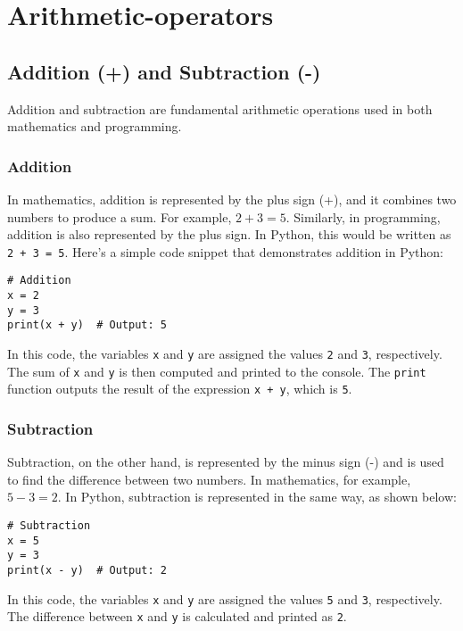 \section{Arithmetic-operators}

\subsection{Addition (+) and Subtraction (-)}
Addition and subtraction are fundamental arithmetic operations used in both mathematics and programming. 

\subsubsection{Addition}
In mathematics, addition is represented by the plus sign (+), and it combines two numbers to produce a sum. For example, $2 + 3 = 5$. Similarly, in programming, addition is also represented by the plus sign. In Python, this would be written as \lstinline|2 + 3 = 5|. Here's a simple code snippet that demonstrates addition in Python:

\begin{lstlisting}
# Addition
x = 2
y = 3
print(x + y)  # Output: 5
\end{lstlisting}

In this code, the variables \lstinline|x| and \lstinline|y| are assigned the values \lstinline|2| and \lstinline|3|, respectively. The sum of \lstinline|x| and \lstinline|y| is then computed and printed to the console. The \lstinline|print| function outputs the result of the expression \lstinline|x + y|, which is \lstinline|5|.

\subsubsection{Subtraction}

Subtraction, on the other hand, is represented by the minus sign (-) and is used to find the difference between two numbers. In mathematics, for example, $5 - 3 = 2$. In Python, subtraction is represented in the same way, as shown below:

\begin{lstlisting}
# Subtraction
x = 5
y = 3
print(x - y)  # Output: 2
\end{lstlisting}

In this code, the variables \lstinline|x| and \lstinline|y| are assigned the values \lstinline|5| and \lstinline|3|, respectively. The difference between \lstinline|x| and \lstinline|y| is calculated and printed as \lstinline|2|.

